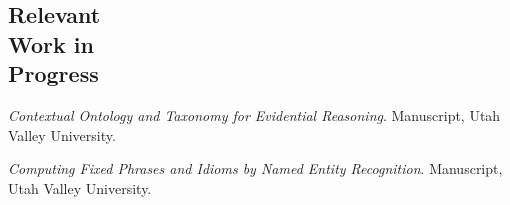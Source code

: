 \documentclass[margin,line,a4paper]{resume}
\begin{document}
\begin{resume}
 
\section{Relevant\\ Work in\\ Progress}  
\textsl{Contextual Ontology and Taxonomy for Evidential Reasoning}. Manuscript, Utah Valley University.
 
\textsl{Computing Fixed Phrases and Idioms by Named Entity Recognition}. Manuscript, Utah Valley University.

 
\end{resume}
\end{document}
